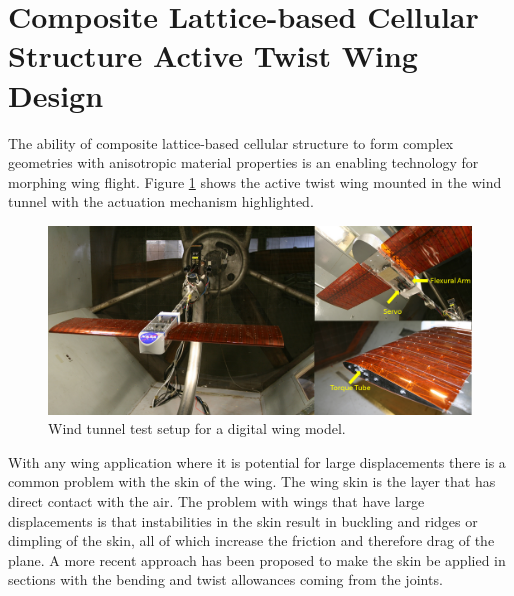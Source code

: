 \documentclass[11pt]{ucthesis}
\begin{document}
\section{Composite Lattice-based Cellular Structure Active Twist Wing Design}

The ability of composite lattice-based cellular structure to form complex geometries with anisotropic material properties is an enabling technology for morphing wing flight. Figure \ref{fig:plane} shows the active twist wing mounted in the wind tunnel with the actuation mechanism highlighted.

\begin{figure}[thpb]
\centering
\includegraphics[width=1\linewidth]{./Figures/Plane.png}
\caption{Wind tunnel test setup for a digital wing model.}
\label{fig:plane}
\end{figure}

With any wing application where it is potential for large displacements there is a common problem with the skin of the wing. The wing skin is the layer that has direct contact with the air. The problem with wings that have large displacements is that instabilities in the skin result in buckling and ridges or dimpling of the skin, all of which increase the friction and therefore drag of the plane. A more recent approach has been proposed to make the skin be applied in sections with the bending and twist allowances coming from the joints.
\end{document}
